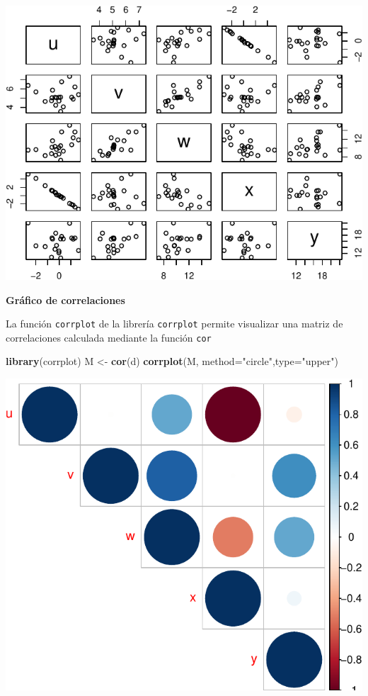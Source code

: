 \documentclass[]{article}
\newenvironment{Shaded}{\begin{snugshade}}{\end{snugshade}}
\newcommand{\KeywordTok}[1]{\textcolor[rgb]{0.13,0.29,0.53}{\textbf{{#1}}}}
\newcommand{\DataTypeTok}[1]{\textcolor[rgb]{0.13,0.29,0.53}{{#1}}}
\newcommand{\StringTok}[1]{\textcolor[rgb]{0.31,0.60,0.02}{{#1}}}
\newcommand{\NormalTok}[1]{{#1}}
\numberwithin{equation}{section}
\begin{document}
\includegraphics{tema1_files/figure-latex/unnamed-chunk-84-1.pdf}

\textbf{Gráfico de correlaciones}

La función \texttt{corrplot} de la librería \texttt{corrplot} permite
visualizar una matriz de correlaciones calculada mediante la función
\texttt{cor}

\begin{Shaded}
\begin{Highlighting}[]
\KeywordTok{library}\NormalTok{(corrplot)}
\NormalTok{M <-}\StringTok{ }\KeywordTok{cor}\NormalTok{(d)}
\KeywordTok{corrplot}\NormalTok{(M, }\DataTypeTok{method=}\StringTok{"circle"}\NormalTok{,}\DataTypeTok{type=}\StringTok{"upper"}\NormalTok{)}
\end{Highlighting}
\end{Shaded}

\includegraphics{tema1_files/figure-latex/unnamed-chunk-85-1.pdf}
\end{document}
